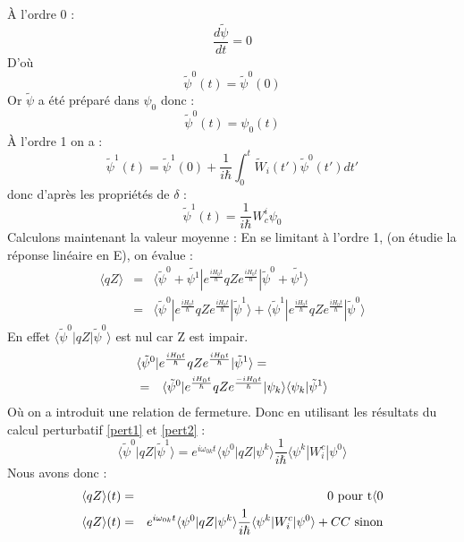 \documentclass[12pt]{book}
\begin{document}
\`A l'ordre 0 :
\begin{equation}
 \frac{d\tilde{\psi}}{dt}=0
\end{equation}
D'o\`u 
\begin{equation}
\tilde{\psi}^0(t)=\tilde{\psi}^0(0)
\end{equation}
Or $\tilde{\psi}$ a \'et\'e pr\'epar\'e dans $\psi_0$ donc :
\begin{equation}
\tilde{\psi}^0(t)=\psi_0(t)
\label{pert1}
\end{equation}
\`A l'ordre 1 on a :
\begin{equation}
\tilde{\psi}^1(t)=\tilde{\psi}^1(0)+\frac{1}{i\hbar}\int_0^t\tilde{W}_i(t\prime)\tilde{\psi}^0(t\prime)dt\prime
\end{equation}
donc d'apr\`es les propri\'et\'es de $\delta$ :
\begin{equation}
\tilde{\psi}^1(t)=\frac{1}{i\hbar}W^i_c\psi_0
\label{pert2}
\end{equation}
Calculons maintenant la valeur moyenne :
En se limitant \`a l'ordre 1, (on \'etudie la r\'eponse lin\'eaire en
E), on \'evalue :
\begin{eqnarray}
 \langle qZ\rangle &=& \langle
\tilde{\psi}^0+\tilde{\psi^1}|e^{\frac{iH_0t}{\hbar}}
qZe^{\frac{iH_0t}{\hbar}}|\tilde{\psi}^0+\tilde{\psi^1}\rangle 
\\ 
&=& \langle \tilde{\psi}^0|
e^{\frac{iH_0t}{\hbar}}qZe^{\frac{iH_0t}{\hbar}}|\tilde{\psi}^1\rangle
+ \langle
\tilde{\psi}^1|e^{\frac{iH_0t}{\hbar}}
qZe^{\frac{iH_0t}{\hbar}}|\tilde{\psi}^0\rangle 
\end{eqnarray}
En effet $ \langle \tilde{\psi}^0|qZ|\tilde{\psi}^0\rangle $ est nul
car Z est impair. 
\begin{eqnarray}
\lefteqn{ \langle
\tilde{\psi}^0|e^{\frac{iH_0t}{\hbar}}qZ
e^{\frac{iH_0t}{\hbar}}|\tilde{\psi}^1\rangle 
=}\\ 
&=& \langle {\tilde{\psi}}^0|
e^{\frac{iH_0t}{\hbar}}qZe^{\frac{-iH_0t}{\hbar}}|{\psi}_k\rangle
\langle {\psi}_k|{\tilde{\psi}}^1\rangle  
\end{eqnarray}
O\`u on a introduit une relation de fermeture. Donc en utilisant les
r\'esultats du calcul perturbatif \ref{pert1} et \ref{pert2} :
\begin{equation}
 \langle \tilde{\psi}^0|qZ|\tilde{\psi}^1\rangle =e^{i\omega_{0k}t} \langle {\psi}^0|qZ|{\psi}^k\rangle \frac{1}{i\hbar} \langle {\psi}^k|W^c_i|{\psi}^0\rangle 
\end{equation}
Nous avons donc :
\begin{eqnarray}
 \langle qZ\rangle (t)&=& 0 {\rm\ pour\ t \langle 0}\\
 \langle qZ\rangle (t)&=&
e^{i\omega_{0k}t} \langle {\psi}^0|qZ|{\psi}^k\rangle \frac{1}{i\hbar} \langle {\psi}^k|W^c_i|{\psi}^0\rangle +CC
{\rm\ sinon}
\end{eqnarray}
\end{document}
